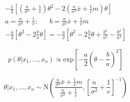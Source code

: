 \documentclass[12pt]{article}
\begin{document}
        \begin{align}
              -\frac{1}{2} \left[ \left( \frac{n}{\sigma^2} + \frac{1}{v}\right) \theta^2 - 2 \left( \frac{n}{\sigma^2} \bar{x} + \frac{1}{v} m \right) \theta  \right] \\
              a=\frac{n}{\sigma^2} + \frac{1}{v}; \hspace{20pt} b = \frac{n}{\sigma^2} \bar{x} + \frac{1}{v}m \\
              -\frac{a}{2} \left [ \theta^2 - 2 \frac{b}{a} \theta \right] = -\frac{a}{2} \left[ \theta^2 - 2 \frac{b}{a} \theta + \frac{b^2}{a^2} - \frac{b^2}{a^2} \right ]
        \end{align}

        \begin{equation}
              p(\theta|x_1,...,x_n) \propto \text{exp} \left[ - \frac{a}{2} \left ( \theta - \frac{b}{a}\right ) ^2 \right]
        \end{equation}

        \begin{equation}
              \theta | x_1,...,x_n \sim \text{N} \left( \frac{\frac{n}{\sigma^2} \bar{x} + \frac{1}{v}m}{\frac{n}{\sigma^2} + \frac{1}{v}}, \left [ \frac{n}{\sigma^2} + \frac{1}{v}\right]^{-1} \right)
        \end{equation}
\end{document}
